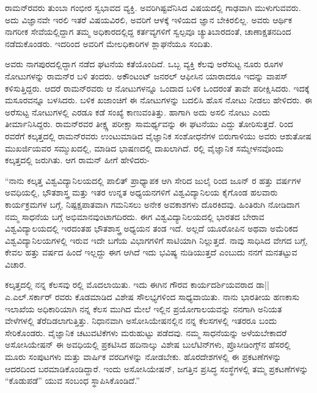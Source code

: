 
ರಾಮನ್‍ರವರು ತುಂಬಾ ಗಂಭೀರ ಸ್ವಭಾವದ ವ್ಯಕ್ತಿ. ಅವರಿಗಿಷ್ಟವೆನಿಸಿದ ವಿಷಯದಲ್ಲಿ ಗಾಢವಾಗಿ ಮುಳುಗುವವರು. ಅದು ವಿಜ್ಞಾನವೇ ಇರಲಿ ಇತರೆ ವಿಷಯವಿರಲಿ, ಅವರಿಗೆ ಆಳಕ್ಕೆ ಇಳಿಯದ ಜ್ಞಾನ ಬೇಕಿರಲಿಲ್ಲ. ಅವರು ಆರ್ಥಿಕ ನಾಗರೀಕ ಸೇವೆಯಲ್ಲಿದ್ದಾಗ ತಮ್ಮ ಅಧಿಕಾರದಲ್ಲಿದ್ದ ಕರ್ತವ್ಯಗಳಿಗೆ ಸ್ವಲ್ಪವೂ ಚ್ಯುತಿಬಾರದಂತೆ, ಚಾಣಾಕ್ಷತನದಿಂದ ನಡೆದುಕೊಂಡರು. ಇದರಿಂದ ಅವರಿಗೆ ಮೇಲಧಿಕಾರಿಗಳ ಶ್ಲಾಘನೆಯೂ ಸಂದಿತು.

ಅವರು ನಾಗಪುರದಲ್ಲಿದ್ದಾಗ ನಡೆದ ಘಟನೆಯ ಕತೆಯೊಂದಿದೆ. ಒಬ್ಬ ವ್ಯಕ್ತಿ ಕೆಲವು ಅರೆಸುಟ್ಟ ನೂರು ರೂಗಳ ನೋಟುಗಳನ್ನು ರಾಮನ್‍ರ ಬಳಿ ತಂದರು. ಅಕೌಂಟಂಟ್ ಜನರಲ್ ಆಫೀಸಿನ ಯಾರಾದರೂ ಇದನ್ನು ವಾಪಸ್ ಕಳಿಸುತ್ತಿದ್ದರು. ಆದರೆ ರಾಮನ್‍ರವರು ಆ ನೋಟುಗಳನ್ನೂ ಒಂದಾದ ಬಳಿಕ ಒಂದರಂತೆ ತಾವೇ ಪರೀಕ್ಷಿಸಿದರು. ಇದಕ್ಕೆ ಮಸೂರವನ್ನೂ ಬಳಸಿದರು. ಬಳಿಕ ಖಜಾಂಚಿಗೆ ಈ ನೋಟುಗಳನ್ನು ಬದಲಿಸಿ ಹೊಸ ನೋಟು ನೀಡಲು ಹೇಳಿದರು. ಈ ಅರೆಸುಟ್ಟ ನೋಟುಗಳಲ್ಲಿ ಎರಡೂ ಕಡೆ ಸಂಖ್ಯೆ ಕಾಣುವಂತಿತ್ತು. ಹಾಗಾಗಿ ಅದು ಅಸಲಿ ನೋಟು ಎಂದು ತೀರ್ಮಾನಿಸಿದ್ದರು. ರಾಮನ್‍ರವರ ತೀಕ್ಷ್ಣ ಪರೀಕ್ಷಾ ಸಾಮರ್ಥ್ಯವನ್ನು ಈ ಘಟನೆಯು ಎದ್ದು ತೋರಿಸುತ್ತದೆ.  ರಿಂದ  ರವರೆಗೆ ಕಲ್ಕತ್ತದಲ್ಲಿ ರಾಮನ್‍ರವರು ಉಂಟುಮಾಡಿದ ವೈಜ್ಞಾನಿಕ ಸಂಶೋಧನೆಗಳ ಬಿರುಗಾಳಿಯು ಅವರು ಆಶುತೋಷ ಮುಖರ್ಜಿಯವರ ಸಮ್ಮುಖದಲ್ಲಿ, ಮಾಡಿದ ಭಾಷಣದಲ್ಲಿ ದಾಖಲಾಗಿದೆ. ರಲ್ಲಿ ವೈಜ್ಞಾನಿಕ ಸಮ್ಮೇಳನವೊಂದು ಕಲ್ಕತ್ತದಲ್ಲಿ ಜರುಗಿತು. ಆಗ ರಾಮನ್ ಹೀಗೆ ಹೇಳಿದರು-

“ನಾನು ಕಲ್ಕತ್ತ ವಿಶ್ವವಿದ್ಯಾನಿಲಯದಲ್ಲಿ ಪಾಲಿತ್ ಪ್ರಾಧ್ಯಾಪಕ ಆಗಿ ಸೇರಿದ ಜುಲೈ  ರಿಂದ ಜೂನ್ ರ ಹತ್ತು ವರ್ಷಗಳ ಅವಧಿಯಲ್ಲಿ, ಭೌತಶಾಸ್ತ್ರ ಮತ್ತು ಇತರ ಉನ್ನತ ಅಧ್ಯಯನಗಳಿಗೆ ವಿಶ್ವವಿದ್ಯಾನಿಲಯ ಕೈಗೊಂಡ ಹಲವಾರು ಕಾರ್ಯಕ್ರಮಗಳ ಬಗ್ಗೆ, ನಿಷ್ಪಕ್ಷಪಾತವಾಗಿ ಗಮನಿಸಲು ಅನೇಕ ಅವಕಾಶಗಳು ದೊರಕಿದವು. ಹಿಂತಿರುಗಿ ನೋಡಿದಾಗ ನಮ್ಮ ಸಾಧನೆಯ ಬಗ್ಗೆ ಅಭಿಮಾನವುಂಟಾಗದಿರದು. ಈಗ ವಿಶ್ವವಿದ್ಯಾನಿಲಯದಲ್ಲಿ ಭಾರತದ ಬೇರಾವ ವಿಶ್ವವಿದ್ಯಾಲಯದಲ್ಲಿ ಇರದಂತಹ ಭೌತಶಾಸ್ತ್ರ ಅಧ್ಯಯನ ತಂಡ ಇದೆ. ಅಲ್ಲದೆ ಯೂರೋಪಿನ ಅಥವಾ ಅಮೆರಿಕದ ವಿಶ್ವವಿದ್ಯಾನಿಲಯಗಳಲ್ಲಿ ಇರುವ ಇದೇ ಬಗೆಯ ವಿಭಾಗಗಳಿಗೆ ಸಾಟಿಯಾಗಿ ನಿಲ್ಲುತ್ತದೆ. ನಾವು ಸಾಧಿಸಿದ ವೇಗದ ಬಗ್ಗೆ, ಕೇವಲ ಹತ್ತು ವರ್ಷದ ಹಿಂದೆ ಇಲ್ಲದ್ದು ಈಗ ಆಗಿದೆ ಇದು ಭವಿಷ್ಯ ನುಡಿಯುತ್ತದೆ ಎಂಬುದು ನನಗೆ ಮನತಟ್ಟುವ ವಿಚಾರ.

ಕಲ್ಕತ್ತದಲ್ಲಿ ನನ್ನ ಕೆಲಸವು ರಲ್ಲಿ ಮೊದಲಾಯಿತು. ಇದು ಈಗಿನ ಗೌರವ ಕಾರ್ಯದರ್ಶಿಯವರಾದ ಡಾ|| ಎ.ಎಲ್.ಸರ್ಕಾರ್ ರವರು ಕೊಡಮಾಡಿದ ವಿಶೇಷ ಸೌಲಭ್ಯಗಳಿಂದ ಸಾಧ್ಯವಾಯಿತು. ನಾನು ಭಾರತೀಯ ಹಣಕಾಸು ಇಲಾಖೆಯ ಅಧಿಕಾರಿಯಾಗಿ ನನ್ನ ಕೆಲಸ ಮುಗಿದ ಮೇಲೆ ಇಲ್ಲಿನ ಪ್ರಯೋಗಾಲಯವನ್ನು ನನಗಾಗಿ ಅನಿಯತ ವೇಳೆಗಳಲ್ಲಿ ತೆರೆದಿಡಲಾಗುತ್ತಿತ್ತು. ನಿಧಾನವಾಗಿ ಅಸೋಸಿಯೇಷನಲ್ಲಿನ ನನ್ನ ಕೆಲಸಗಳಲ್ಲಿ ಇತರರೂ ಬಂದು ಸೇರಿಕೊಂಡರು. ವೈಜ್ಞಾನಿಕ ಚಟುವಟಿಕೆಗಳು ಮರುಹುಟ್ಟು ಪಡೆದವು. ನಮ್ಮ ಸಾಧನೆಯನ್ನು ಅಳೆಯಬೇಕಾದರೆ ಅಸೋಸಿಯೇಷನ್ ಈ ಅವಧಿಯಲ್ಲಿ ಪ್ರಕಟಿಸಿದ ಹದಿನಾಲ್ಕು ವಿಶೇಷ ಬುಲೆಟಿನ್‍ಗಳು, ಪ್ರೊಸೀಡಿಂಗ್ಸ್‌ನ ಹೆಸರಲ್ಲಿ ಮೂರು ಸಂಪುಟಗಳು ಮತ್ತು ವಾರ್ಷಿಕ ವರದಿಗಳನ್ನು ನೋಡಬೇಕು. ಹೊರದೇಶಗಳಲ್ಲಿ ಈ ಪ್ರಕಟಣೆಗಳನ್ನು ಆದರದಿಂದ ಬರಮಾಡಿಕೊಂಡಿದ್ದಾರೆ. ಇಂದು ಅಸೋಸಿಯೇಷನ್, ಜಗತ್ತಿನ ಪ್ರಸಿದ್ಧ ಸಂಸ್ಥೆಗಳಲ್ಲಿ ತಮ್ಮ ಪ್ರಕಟಣೆಗಳನ್ನು “ಕೊಡುಪಡೆ” ಯುವ ಸಂಬಂಧ ಸ್ಥಾಪಿಸಿಕೊಂಡಿದೆ.”

